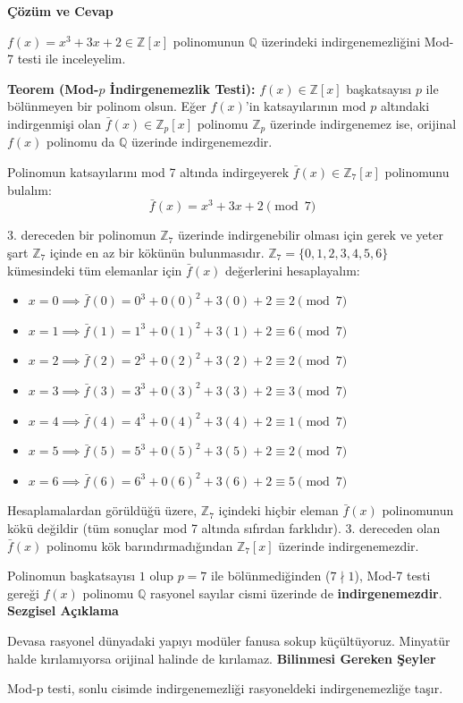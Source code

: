 \documentclass[11pt, a4paper]{article}
\newenvironment{cozum}{
    \vspace{0.5cm}
    \noindent\textcolor{green!60!black}{\faCheckCircle\enspace \textbf{\Large Çözüm ve Cevap}}\par\vspace{0.2cm}
}{}
\newenvironment{sezgisel}{
    \vspace{0.5cm}
    \noindent\textcolor{orange!80!black}{\faLightbulb\enspace \textbf{\Large Sezgisel Açıklama}}\par\vspace{0.2cm}
    \itshape
}{}
\newenvironment{bilgi}{
    \vspace{0.5cm}
    \noindent\textcolor{red!70!black}{\faExclamationTriangle\enspace \textbf{\Large Bilinmesi Gereken Şeyler}}\par\vspace{0.2cm}
}{}
\begin{document}
\begin{cozum}
$f(x) = x^{3} + 3x + 2 \in \mathbb{Z}[x]$ polinomunun $\mathbb{Q}$ üzerindeki indirgenemezliğini Mod-7 testi ile inceleyelim.

\textbf{Teorem (Mod-$p$ İndirgenemezlik Testi):} $f(x) \in \mathbb{Z}[x]$ başkatsayısı $p$ ile bölünmeyen bir polinom olsun. Eğer $f(x)$'in katsayılarının mod $p$ altındaki indirgenmişi olan $\bar{f}(x) \in \mathbb{Z}_p[x]$ polinomu $\mathbb{Z}_p$ üzerinde indirgenemez ise, orijinal $f(x)$ polinomu da $\mathbb{Q}$ üzerinde indirgenemezdir.

Polinomun katsayılarını mod 7 altında indirgeyerek $\bar{f}(x) \in \mathbb{Z}_{7}[x]$ polinomunu bulalım:
\[ \bar{f}(x) = x^{3} + 3x + 2 \pmod{7} \]

3. dereceden bir polinomun $\mathbb{Z}_{7}$ üzerinde indirgenebilir olması için gerek ve yeter şart $\mathbb{Z}_{7}$ içinde en az bir kökünün bulunmasıdır. $\mathbb{Z}_{7} = \{0, 1, 2, 3, 4, 5, 6\}$ kümesindeki tüm elemanlar için $\bar{f}(x)$ değerlerini hesaplayalım:
\begin{itemize}
    \item $x = 0 \implies \bar{f}(0) = 0^3 + 0(0)^2 + 3(0) + 2 \equiv 2 \pmod{7}$
    \item $x = 1 \implies \bar{f}(1) = 1^3 + 0(1)^2 + 3(1) + 2 \equiv 6 \pmod{7}$
    \item $x = 2 \implies \bar{f}(2) = 2^3 + 0(2)^2 + 3(2) + 2 \equiv 2 \pmod{7}$
    \item $x = 3 \implies \bar{f}(3) = 3^3 + 0(3)^2 + 3(3) + 2 \equiv 3 \pmod{7}$
    \item $x = 4 \implies \bar{f}(4) = 4^3 + 0(4)^2 + 3(4) + 2 \equiv 1 \pmod{7}$
    \item $x = 5 \implies \bar{f}(5) = 5^3 + 0(5)^2 + 3(5) + 2 \equiv 2 \pmod{7}$
    \item $x = 6 \implies \bar{f}(6) = 6^3 + 0(6)^2 + 3(6) + 2 \equiv 5 \pmod{7}$
\end{itemize}

Hesaplamalardan görüldüğü üzere, $\mathbb{Z}_{7}$ içindeki hiçbir eleman $\bar{f}(x)$ polinomunun kökü değildir (tüm sonuçlar mod 7 altında sıfırdan farklıdır). 3. dereceden olan $\bar{f}(x)$ polinomu kök barındırmadığından $\mathbb{Z}_{7}[x]$ üzerinde indirgenemezdir.

Polinomun başkatsayısı $1$ olup $p = 7$ ile bölünmediğinden ($7 \nmid 1$), Mod-7 testi gereği $f(x)$ polinomu $\mathbb{Q}$ rasyonel sayılar cismi üzerinde de \textbf{indirgenemezdir}.
\end{cozum}
\begin{sezgisel}
Devasa rasyonel dünyadaki yapıyı modüler fanusa sokup küçültüyoruz. Minyatür halde kırılamıyorsa orijinal halinde de kırılamaz.
\end{sezgisel}
\begin{bilgi}
Mod-p testi, sonlu cisimde indirgenemezliği rasyoneldeki indirgenemezliğe taşır.
\end{bilgi}
\end{document}

